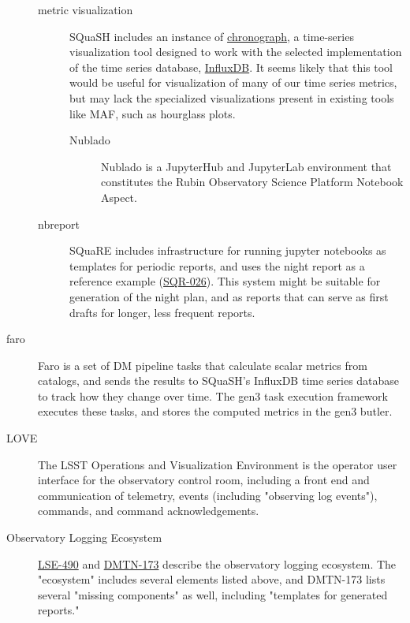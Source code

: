 \begin{description}
\begin{description}
\item[{metric visualization}] SQuaSH includes an instance of \href{https://docs.influxdata.com/chronograf/v1.8/}{chronograph}, a time-series visualization tool designed to work with the selected implementation of the time series database, \href{https://www.influxdata.com/products/influxdb/}{InfluxDB}. It seems likely that this tool would be useful for visualization of many of our time series metrics, but may lack the specialized visualizations present in existing tools like MAF, such as hourglass plots.
\begin{description}
\item[{Nublado}] Nublado is a JupyterHub and JupyterLab environment that constitutes the Rubin Observatory Science Platform Notebook Aspect.
\end{description}
\item[{nbreport}] SQuaRE includes infrastructure for running jupyter notebooks as templates for periodic reports, and uses the night report as a reference example (\href{https://sqr-026.lsst.io/}{SQR-026}). This system might be suitable for generation of the night plan, and as reports that can serve as first drafts for longer, less frequent reports.
\end{description}
\item[{faro}] Faro is a set of DM pipeline tasks that calculate scalar metrics from catalogs, and sends the results to SQuaSH's InfluxDB time series database to track how they change over time. The gen3 task execution framework executes these tasks, and stores the computed metrics in the gen3 butler.
\item[{LOVE}] The LSST Operations and Visualization Environment is the operator user interface for the observatory control room, including a front end and communication of telemetry, events (including "observing log events"), commands, and command acknowledgements.
\item[{Observatory Logging Ecosystem}] \href{https://ls.st/lse-490}{LSE-490} and \href{https://dmtn-173.lsst.io/}{DMTN-173} describe the observatory logging ecosystem. The "ecosystem" includes several elements listed above, and DMTN-173 lists several "missing components" as well, including "templates for generated reports."
\end{description}
